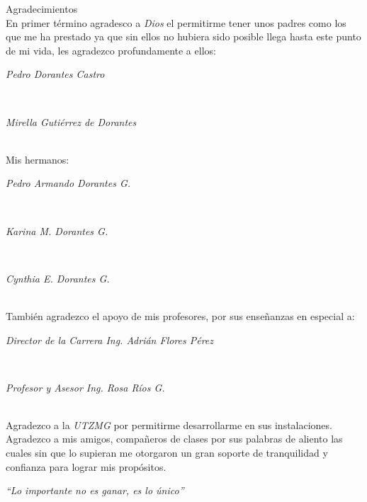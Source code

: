 \documentclass[12pt,spanish]{report}
\begin{document}
{\Huge{Agradecimientos}}\\



En primer t\'ermino agradesco a \emph{Dios} el permitirme tener unos padres como los que me ha prestado ya que sin ellos no hubiera sido posible llega hasta este punto de mi vida, les agradezco profundamente a ellos:\\

\centerline{\emph{Pedro Dorantes Castro}}\\
\centerline{\emph{Mirella Guti\'errez de Dorantes}}\\

Mis hermanos:\\
\centerline{\emph{Pedro Armando Dorantes G.}}\\
\centerline{\emph{Karina M. Dorantes G.}}\\
\centerline{\emph{Cynthia E. Dorantes G.}}\\

Tambi\'en agradezco el apoyo de mis profesores, por sus enseñanzas en especial a:\\
\centerline{\emph{Director de la Carrera Ing. Adri\'an Flores P\'erez}}\\
\centerline{\emph{Profesor y Asesor Ing. Rosa R\'ios G.}}\\ 


Agradezco a la \emph{UTZMG} por permitirme desarrollarme en sus instalaciones.\\

Agradezco a mis amigos, compañeros de clases por sus palabras de aliento las cuales sin que lo supieran me otorgaron un gran soporte de tranquilidad y confianza para lograr mis prop\'ositos.\\


\centerline{\emph{``Lo importante no es ganar, es lo \'unico''}}\\

\end{document}
